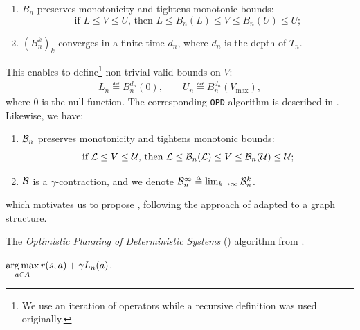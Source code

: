 \begin{lemma}[Properties of $B_n$]
	\begin{leftbar}[lemmabar]
	\label{lem:properties-b-tree}
	\begin{enumerate}[label=(\roman*)]
		\item $B_n$ preserves monotonicity and tightens monotonic bounds: $$
		\text{if } L\leq V\leq U \text{, then } L \leq B_n(L) \leq V \leq B_n(U) \leq U;
		$$
		\item $(B_n^k)_k$ converges in a finite time $d_n$, where $d_n$ is the depth of $T_n$. 
	\end{enumerate}
	\end{leftbar}
\end{lemma}
This enables \citet{Hren2008optimistic} to define\footnote{We use an iteration of operators while a recursive definition was used originally.} non-trivial valid bounds on $V$:
\begin{align}
\label{eq:opd-bounds}
L_n \eqdef B_n^{d_n}(0), \qquad U_n \eqdef B_n^{d_n}(V_{\max}),
\end{align}
where $0$ is the null function.
The corresponding \texttt{OPD} algorithm is described in . Likewise, we have:
\begin{lemma}[Properties of $\cB_n$]
	\begin{leftbar}[lemmabar]
	\label{lem:properties-b-graph}
	\begin{enumerate}[label=(\roman*)]
		\item $\cB_n$ preserves monotonicity and tightens monotonic bounds: $$
		\text{if } \mathcal{L}\leq V\leq \mathcal{U} \text{, then } \mathcal{L} \leq \mathcal{B}_n(\mathcal{L}) \leq V \leq \mathcal{B}_n(\mathcal{U}) \leq \mathcal{U};
		$$
		\item $\mathcal{B}$ is a $\gamma$-contraction, and we denote $\cB_n^{\infty} \eqdef \lim_{k\rightarrow \infty} \cB_n^k$.
	\end{enumerate}
	\end{leftbar}
\end{lemma}
which motivates us to propose , following the approach of  adapted to a graph structure.

\begin{algorithm}[th]
	\caption{The \emph{Optimistic Planning of Deterministic Systems} (\OPD) algorithm from \citep{Hren2008optimistic}.}
	\label{alg:opd}
	\DontPrintSemicolon
	\Return $\displaystyle\operatorname*{arg\,max}_{a\in A} r(s, a) + \gamma L_n(a)$. \;
\end{algorithm}

